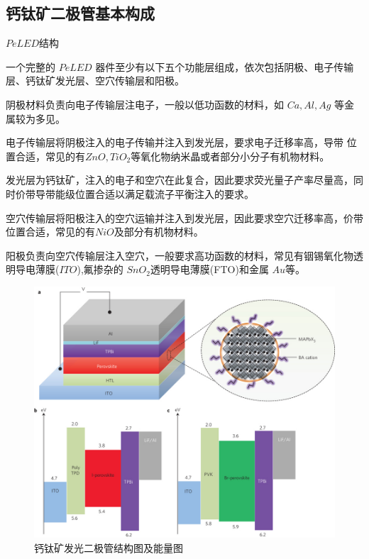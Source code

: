 \documentclass{beamer}[fontset=windows]
\begin{document}
\subsection{钙钛矿二极管基本构成}
\begin{frame}
	\begin{block}{$PeLED$结构}
		\begin{itemize}\small{
			\item 一个完整的 $PeLED$ 器件至少有以下五个功能层组成，依次包括阴极、电子传输层、钙钛矿发光层、空穴传输层和阳极。
			\item 阴极材料负责向电子传输层注电子，一般以低功函数的材料，如 $Ca, Al,Ag$ 等金属较为多见。
			\item 电子传输层将阴极注入的电子传输并注入到发光层，要求电子迁移率高，导带 位置合适，常见的有$ ZnO,TiO_{2} $等氧化物纳米晶或者部分小分子有机物材料。
			\item 发光层为钙钛矿，注入的电子和空穴在此复合，因此要求荧光量子产率尽量高，同时价带导带能级位置合适以满足载流子平衡注入的要求。
			\item 空穴传输层将阳极注入的空穴运输并注入到发光层，因此要求空穴迁移率高，价带位置合适，常见的有$ NiO$及部分有机物材料。
			\item 阳极负责向空穴传输层注入空穴，一般要求高功函数的材料，常见有铟锡氧化物透明导电薄膜($ITO$),氟掺杂的 $SnO_{2}$透明导电薄膜(FTO)和金属 $Au $等。}
		\end{itemize}
	\end{block}
\end{frame}
\begin{frame}
	\begin{figure}[H]
		\centering
		\hspace{2em}\includegraphics[width=.75\linewidth]{pic/6.jpg}
		\caption{钙钛矿发光二极管结构图及能量图
		}
	\end{figure}
\end{frame}
\end{document}
